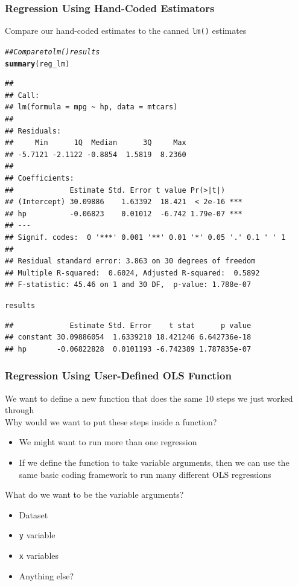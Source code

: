 \documentclass{beamer}\usepackage[]{graphicx}\usepackage[]{color}
\makeatletter
\newcommand{\hlcom}[1]{\textcolor[rgb]{0.678,0.584,0.686}{\textit{#1}}}%
\newcommand{\hlstd}[1]{\textcolor[rgb]{0.345,0.345,0.345}{#1}}%
\newcommand{\hlkwd}[1]{\textcolor[rgb]{0.737,0.353,0.396}{\textbf{#1}}}%
\newenvironment{kframe}{%
 \def\at@end@of@kframe{}%
 \ifinner\ifhmode%
  \def\at@end@of@kframe{\end{minipage}}%
  \begin{minipage}{\columnwidth}%
 \fi\fi%
 \def\FrameCommand##1{\hskip\@totalleftmargin \hskip-\fboxsep
 \colorbox{shadecolor}{##1}\hskip-\fboxsep
     \hskip-\linewidth \hskip-\@totalleftmargin \hskip\columnwidth}%
 \MakeFramed {\advance\hsize-\width
   \@totalleftmargin\z@ \linewidth\hsize
   \@setminipage}}%
 {\par\unskip\endMakeFramed%
 \at@end@of@kframe}
\newenvironment{knitrout}{}{} %
\makeatother
\begin{document}
\begin{frame}[fragile]\frametitle{Regression Using Hand-Coded Estimators}
    Compare our hand-coded estimates to the canned \texttt{lm()} estimates
    \vspace{1ex}
\begin{knitrout}\tiny
{}\color{fgcolor}\begin{kframe}
\begin{alltt}
\hlcom{## Compare to lm() results}
\hlkwd{summary}\hlstd{(reg_lm)}
\end{alltt}
\begin{verbatim}
## 
## Call:
## lm(formula = mpg ~ hp, data = mtcars)
## 
## Residuals:
##     Min      1Q  Median      3Q     Max 
## -5.7121 -2.1122 -0.8854  1.5819  8.2360 
## 
## Coefficients:
##             Estimate Std. Error t value Pr(>|t|)    
## (Intercept) 30.09886    1.63392  18.421  < 2e-16 ***
## hp          -0.06823    0.01012  -6.742 1.79e-07 ***
## ---
## Signif. codes:  0 '***' 0.001 '**' 0.01 '*' 0.05 '.' 0.1 ' ' 1
## 
## Residual standard error: 3.863 on 30 degrees of freedom
## Multiple R-squared:  0.6024,	Adjusted R-squared:  0.5892 
## F-statistic: 45.46 on 1 and 30 DF,  p-value: 1.788e-07
\end{verbatim}
\begin{alltt}
\hlstd{results}
\end{alltt}
\begin{verbatim}
##             Estimate Std. Error    t stat      p value
## constant 30.09886054  1.6339210 18.421246 6.642736e-18
## hp       -0.06822828  0.0101193 -6.742389 1.787835e-07
\end{verbatim}
\end{kframe}
\end{knitrout}
\end{frame}

\begin{frame}[fragile]\frametitle{Regression Using User-Defined OLS Function}
    We want to define a new function that does the same 10 steps we just worked through \\
    \vspace{3ex}
    Why would we want to put these steps inside a function?
    \begin{itemize}
        \item We might want to run more than one regression
        \item If we define the function to take variable arguments, then we can use the same basic coding framework to run many different OLS regressions
    \end{itemize}
    \vspace{3ex}
    What do we want to be the variable arguments?
    \begin{itemize}
        \item Dataset
        \item \texttt{y} variable
        \item \texttt{x} variables
        \item Anything else?
    \end{itemize}
\end{frame}
\end{document}
